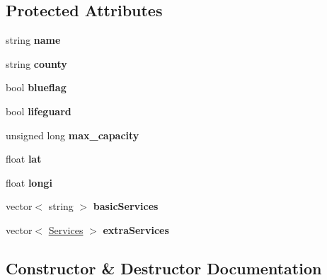 \subsection*{Protected Attributes}
\begin{DoxyCompactItemize}
\item 
\mbox{\label{class_beach_a5855b0e17ea41f7af6ed6633d0bb41cc}} 
string {\bfseries name}
\item 
\mbox{\label{class_beach_a484973499734b3c2994385564adc2c81}} 
string {\bfseries county}
\item 
\mbox{\label{class_beach_ac2d291e8784c9f0d8919134cf87ff5f0}} 
bool {\bfseries blueflag}
\item 
\mbox{\label{class_beach_a9625fc4212556b87b9e8389697ec9602}} 
bool {\bfseries lifeguard}
\item 
\mbox{\label{class_beach_a23bd6f845a6226cb173d6f505e480fc9}} 
unsigned long {\bfseries max\+\_\+capacity}
\item 
\mbox{\label{class_beach_ac3b74e09332b4605d20996434bdac781}} 
float {\bfseries lat}
\item 
\mbox{\label{class_beach_a300efaac5c8a70309ad790378a61d809}} 
float {\bfseries longi}
\item 
\mbox{\label{class_beach_a7b3208969cfa2492ac219cc7b8403717}} 
vector$<$ string $>$ {\bfseries basic\+Services}
\item 
\mbox{\label{class_beach_a7f4fe9ab51968a44adf478b22b164364}} 
vector$<$ \hyperlink{class_services}{Services} $>$ {\bfseries extra\+Services}
\end{DoxyCompactItemize}


\subsection{Constructor \& Destructor Documentation}
\mbox{\label{class_beach_addc648363a2a06c27983955cb1efe923}} 
